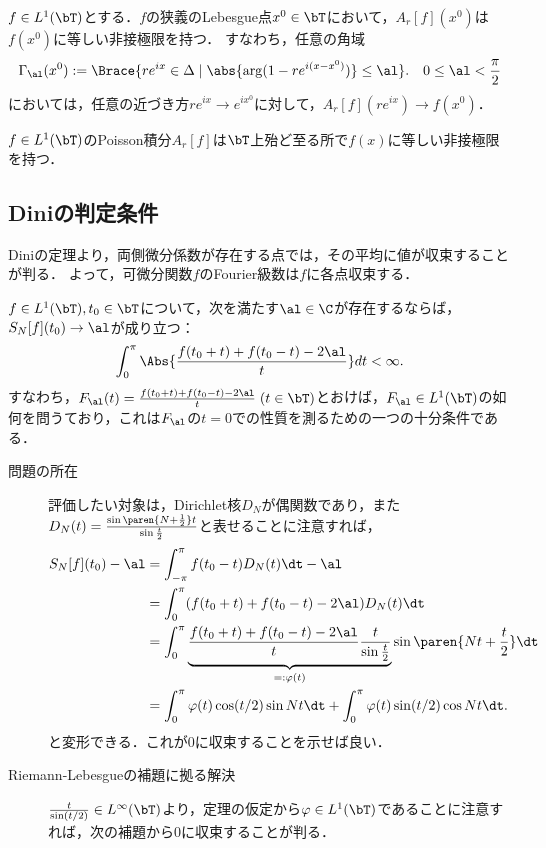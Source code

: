 \documentclass[uplatex,dvipdfmx]{jsreport}
\begin{document}
\begin{theorem}[Fatou]
    $f\in L^1(\bT)$とする．$f$の狭義のLebesgue点$x^0\in\bT$において，$A_r[f](x^0)$は$f(x^0)$に等しい非接極限を持つ．
    すなわち，任意の角域
    \[\Gamma_\al(x^0):=\Brace{re^{ix}\in\Delta\mid\abs{\arg(1-re^{i(x-x^0)})}\le\al}.\quad 0\le\al<\frac{\pi}{2}\]
    においては，任意の近づき方$re^{ix}\to e^{ix^0}$に対して，$A_r[f](re^{ix})\to f(x^0)$．
\end{theorem}
\begin{remarks}
    $f\in L^1(\bT)$のPoisson積分$A_r[f]$は$\bT$上殆ど至る所で$f(x)$に等しい非接極限を持つ．
\end{remarks}

\subsection{Diniの判定条件}

\begin{tcolorbox}[colframe=ForestGreen, colback=ForestGreen!10!white,breakable,colbacktitle=ForestGreen!40!white,coltitle=black,fonttitle=\bfseries\sffamily,
title=]
    Diniの定理より，両側微分係数が存在する点では，その平均に値が収束することが判る．
    よって，可微分関数$f$のFourier級数は$f$に各点収束する．
\end{tcolorbox}

\begin{theorem}
    $f\in L^1(\bT),t_0\in\bT$について，次を満たす$\al\in\C$が存在するならば，$S_N[f](t_0)\to\al$が成り立つ：
    \[\int^\pi_0\Abs{\frac{f(t_0+t)+f(t_0-t)-2\al}{t}}dt<\infty.\]
    すなわち，$F_\al(t)=\frac{f(t_0+t)+f(t_0-t)-2\al}{t}\;(t\in\bT)$とおけば，$F_\al\in L^1(\bT)$の如何を問うており，これは$F_\al$の$t=0$での性質を測るための一つの十分条件である．
\end{theorem}
\begin{Proof}\mbox{}
    \begin{description}
        \item[問題の所在] 
        評価したい対象は，Dirichlet核$D_N$が偶関数であり，また$D_N(t)=\frac{\sin\paren{N+\frac{1}{2}}t}{\sin\frac{t}{2}}$と表せることに注意すれば，
        \begin{align*}
            S_N[f](t_0)-\al&=\int^\pi_{-\pi}f(t_0-t)D_N(t)\dt-\al\\
            &=\int^\pi_0(f(t_0+t)+f(t_0-t)-2\al)D_N(t)\dt\\
            &=\int^\pi_0\underbrace{\frac{f(t_0+t)+f(t_0-t)-2\al}{t}\frac{t}{\sin\frac{t}{2}}}_{=:\varphi(t)}\sin\paren{Nt+\frac{t}{2}}\dt\\
            &=\int^\pi_0\varphi(t)\cos(t/2)\sin Nt\dt+\int^\pi_0\varphi(t)\sin(t/2)\cos Nt\dt.
        \end{align*}
        と変形できる．これが$0$に収束することを示せば良い．
        \item[Riemann-Lebesgueの補題に拠る解決]
        $\frac{t}{\sin(t/2)}\in L^\infty(\bT)$より，定理の仮定から$\varphi\in L^1(\bT)$であることに注意すれば，次の補題から$0$に収束することが判る．
    \end{description}
\end{Proof}
\end{document}
